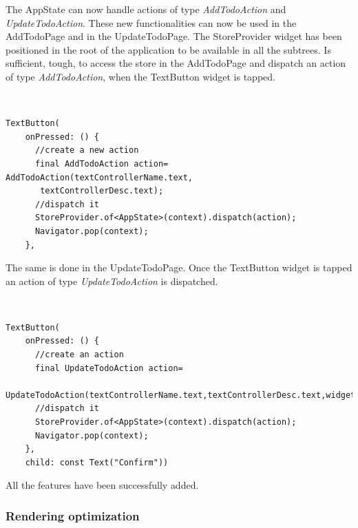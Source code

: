 The AppState can now handle actions of type \textit{AddTodoAction} and \textit{UpdateTodoAction}. These new functionalities can now be used in the AddTodoPage and in the UpdateTodoPage. The StoreProvider widget has been positioned in the root of the application to be available in all the subtrees. Is sufficient, tough, to access the store in the AddTodoPage and dispatch an action of type \textit{AddTodoAction}, when the TextButton widget is tapped.
\begin{code}
\mbox{}\\
 \mbox{}
		\label{code:2.14}
\begin{verbatim}
TextButton(
    onPressed: () {
      //create a new action
      final AddTodoAction action= AddTodoAction(textControllerName.text,
       textControllerDesc.text);
	  //dispatch it      
      StoreProvider.of<AppState>(context).dispatch(action);
      Navigator.pop(context);
    },
\end{verbatim}
\mbox{}
\end{code}

The same is done in the UpdateTodoPage. Once the TextButton widget is tapped an action of type \textit{UpdateTodoAction} is dispatched.
\begin{code}
\mbox{}\\
 \mbox{}
		\label{code:2.14}
\begin{verbatim}
TextButton(
    onPressed: () {
      //create an action
      final UpdateTodoAction action=
       UpdateTodoAction(textControllerName.text,textControllerDesc.text,widget.todo.id);
	  //dispatch it      
      StoreProvider.of<AppState>(context).dispatch(action);
      Navigator.pop(context);
    },
    child: const Text("Confirm"))
\end{verbatim}
\mbox{}
\end{code}

All the features have been successfully added.
\subsubsection{Rendering optimization}  \label{par:todo_app_inherited_widget_introduction}

